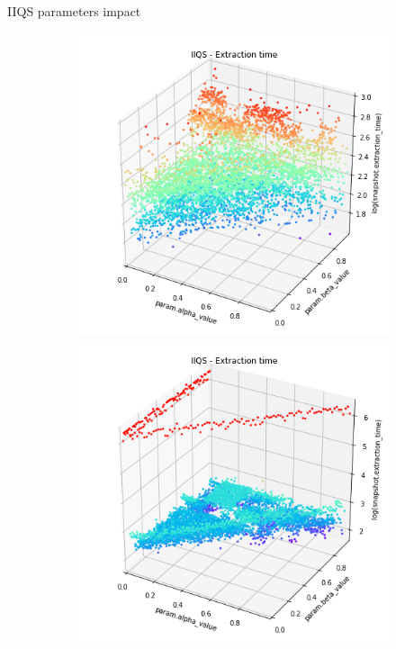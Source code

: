 \documentclass{beamer}
\begin{document}
\begin{frame}{IIQS parameters impact}
    \begin{figure}
        \centering
        \begin{subfigure}[b]{\textwidth}
            \centering
            \includegraphics[height=0.38\textheight]{chapter4/04-alphabeta-noclass.png.0-0.png}
            \includegraphics[height=0.38\textheight]{chapter4/04-alphabeta-noclass-asc.png.0-0.png}

\end{subfigure}
\end{figure}
\end{frame}
\end{document}
